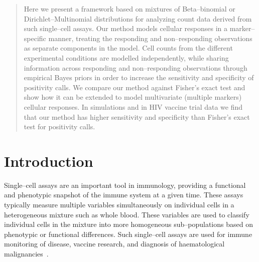 \documentclass[11pt]{article}
\begin{document}
\begin{abstract}
Here we present a framework based on mixtures of Beta--binomial or Dirichlet--Multinomial distributions for analyzing count data derived from such single--cell assays.  Our method models cellular responses in a marker--specific manner, treating the responding and non--responding observations as separate components in the model. Cell counts from the different experimental conditions are modelled independently, while sharing information across responding and non--responding observations through empirical Bayes priors in order to increase the sensitivity and specificity of positivity calls. We compare our method against Fisher's exact test and show how it can be extended to model multivariate (multiple markers) cellular responses. In simulations and in HIV vaccine trial data we find that our method has higher sensitivity and specificity than Fisher's exact test for positivity calls. 
\end{abstract}

\section{Introduction}
Single--cell assays are an important tool in immunology, providing a functional and phenotypic snapshot of the immune system at a given time. These assays typically measure multiple variables simultaneously on individual cells in a heterogeneous mixture such as whole blood. These variables are used to classify individual cells in the mixture into more homogeneous sub--populations based on phenotypic or functional differences. Such single--cell assays are used for immune monitoring of disease, vaccine research, and diagnosis of haematological malignancies~\cite{Altman:1996wf,Betts:2006dw,Inokuma:2007tn}.
\end{document}
